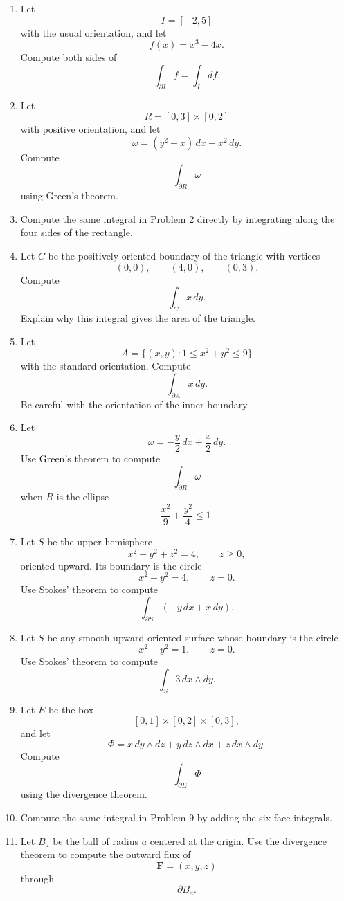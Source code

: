 \begin{enumerate}
\item Let
\[
    I=[-2,5]
\]
with the usual orientation, and let
\[
    f(x)=x^3-4x.
\]
Compute both sides of
\[
    \int_{\partial I}f=\int_I df.
\]

\item Let
\[
    R=[0,3]\times[0,2]
\]
with positive orientation, and let
\[
    \omega=(y^2+x)\,dx+x^2\,dy.
\]
Compute
\[
    \int_{\partial R}\omega
\]
using Green's theorem.

\item Compute the same integral in Problem \(2\) directly by integrating along the four
sides of the rectangle.

\item Let \(C\) be the positively oriented boundary of the triangle with vertices
\[
    (0,0),\qquad (4,0),\qquad (0,3).
\]
Compute
\[
    \int_C x\,dy.
\]
Explain why this integral gives the area of the triangle.

\item Let
\[
    A=\{(x,y):1\le x^2+y^2\le9\}
\]
with the standard orientation.  Compute
\[
    \int_{\partial A}x\,dy.
\]
Be careful with the orientation of the inner boundary.

\item Let
\[
    \omega=-\frac y2\,dx+\frac x2\,dy.
\]
Use Green's theorem to compute
\[
    \int_{\partial R}\omega
\]
when \(R\) is the ellipse
\[
    \frac{x^2}{9}+\frac{y^2}{4}\le1.
\]

\item Let \(S\) be the upper hemisphere
\[
    x^2+y^2+z^2=4,
    \qquad z\ge0,
\]
oriented upward.  Its boundary is the circle
\[
    x^2+y^2=4,\qquad z=0.
\]
Use Stokes' theorem to compute
\[
    \int_{\partial S}(-y\,dx+x\,dy).
\]

\item Let \(S\) be any smooth upward-oriented surface whose boundary is the circle
\[
    x^2+y^2=1,\qquad z=0.
\]
Use Stokes' theorem to compute
\[
    \int_S 3\,dx\wedge dy.
\]

\item Let \(E\) be the box
\[
    [0,1]\times[0,2]\times[0,3],
\]
and let
\[
    \Phi=x\,dy\wedge dz+y\,dz\wedge dx+z\,dx\wedge dy.
\]
Compute
\[
    \int_{\partial E}\Phi
\]
using the divergence theorem.

\item Compute the same integral in Problem \(9\) by adding the six face integrals.

\item Let \(B_a\) be the ball of radius \(a\) centered at the origin.  Use the divergence
theorem to compute the outward flux of
\[
    \mathbf F=(x,y,z)
\]
through
\[
    \partial B_a.
\]


\end{enumerate}
